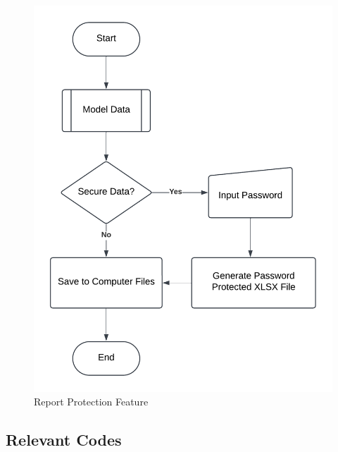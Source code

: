 \begin{appendices}
\begin{centerappendixtitle}
		\begin{figure}[h]
			\centering
			\caption{Report Protection Feature}
			\label{protectFlow}
			\includegraphics[width=\textwidth,height=\textheight,keepaspectratio]{appendix/protect f}
		\end{figure}
		
		
		
	\end{centerappendixtitle}
	
	\begin{centerappendixtitle}
		\chapter{Relevant Codes}
		\pagebreak
		

\end{centerappendixtitle}
\end{appendices}
